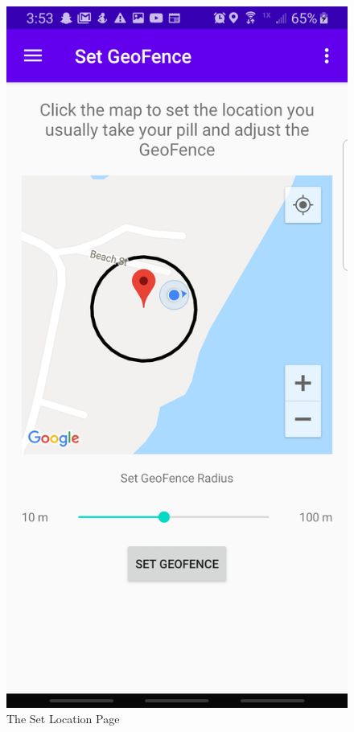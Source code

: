\documentclass{article}
\begin{document}
\begin{figure}[H]
\centering
\includegraphics[scale= .1]{img/geofence.jpg}
\caption{The Set Location Page}
\label{fig:location} 
\end{figure}
\end{document}
